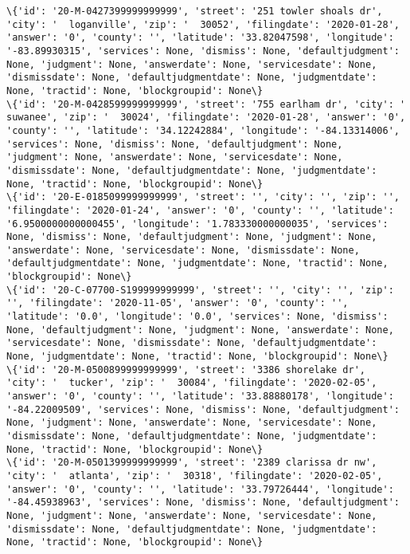 \documentclass[11pt]{article}
\begin{document}
\begin{Verbatim}[commandchars=\\\{\}]
\{'id': '20-M-0427399999999999', 'street': '251 towler shoals dr', 'city': '  loganville', 'zip': '  30052', 'filingdate': '2020-01-28', 'answer': '0', 'county': '', 'latitude': '33.82047598', 'longitude': '-83.89930315', 'services': None, 'dismiss': None, 'defaultjudgment': None, 'judgment': None, 'answerdate': None, 'servicesdate': None, 'dismissdate': None, 'defaultjudgmentdate': None, 'judgmentdate': None, 'tractid': None, 'blockgroupid': None\}
\{'id': '20-M-0428599999999999', 'street': '755 earlham dr', 'city': '  suwanee', 'zip': '  30024', 'filingdate': '2020-01-28', 'answer': '0', 'county': '', 'latitude': '34.12242884', 'longitude': '-84.13314006', 'services': None, 'dismiss': None, 'defaultjudgment': None, 'judgment': None, 'answerdate': None, 'servicesdate': None, 'dismissdate': None, 'defaultjudgmentdate': None, 'judgmentdate': None, 'tractid': None, 'blockgroupid': None\}
\{'id': '20-E-0185099999999999', 'street': '', 'city': '', 'zip': '', 'filingdate': '2020-01-24', 'answer': '0', 'county': '', 'latitude': '6.9500000000000455', 'longitude': '1.783330000000035', 'services': None, 'dismiss': None, 'defaultjudgment': None, 'judgment': None, 'answerdate': None, 'servicesdate': None, 'dismissdate': None, 'defaultjudgmentdate': None, 'judgmentdate': None, 'tractid': None, 'blockgroupid': None\}
\{'id': '20-C-07700-S199999999999', 'street': '', 'city': '', 'zip': '', 'filingdate': '2020-11-05', 'answer': '0', 'county': '', 'latitude': '0.0', 'longitude': '0.0', 'services': None, 'dismiss': None, 'defaultjudgment': None, 'judgment': None, 'answerdate': None, 'servicesdate': None, 'dismissdate': None, 'defaultjudgmentdate': None, 'judgmentdate': None, 'tractid': None, 'blockgroupid': None\}
\{'id': '20-M-0500899999999999', 'street': '3386 shorelake dr', 'city': '  tucker', 'zip': '  30084', 'filingdate': '2020-02-05', 'answer': '0', 'county': '', 'latitude': '33.88880178', 'longitude': '-84.22009509', 'services': None, 'dismiss': None, 'defaultjudgment': None, 'judgment': None, 'answerdate': None, 'servicesdate': None, 'dismissdate': None, 'defaultjudgmentdate': None, 'judgmentdate': None, 'tractid': None, 'blockgroupid': None\}
\{'id': '20-M-0501399999999999', 'street': '2389 clarissa dr nw', 'city': '  atlanta', 'zip': '  30318', 'filingdate': '2020-02-05', 'answer': '0', 'county': '', 'latitude': '33.79726444', 'longitude': '-84.45938963', 'services': None, 'dismiss': None, 'defaultjudgment': None, 'judgment': None, 'answerdate': None, 'servicesdate': None, 'dismissdate': None, 'defaultjudgmentdate': None, 'judgmentdate': None, 'tractid': None, 'blockgroupid': None\}

\end{Verbatim}
\end{document}
